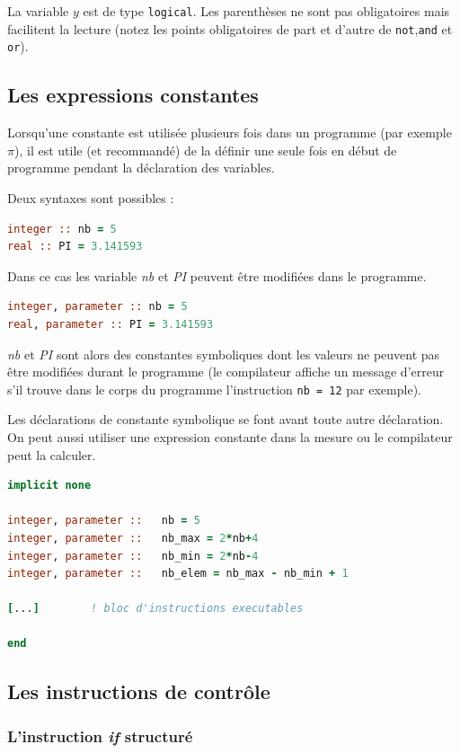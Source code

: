\documentclass[a4paper,twoside]{article}
\begin{document}
La variable $y$ est de type \texttt{logical}. Les parenthèses ne sont 
pas obligatoires mais facilitent la lecture (notez les points 
obligatoires de part et d'autre de \texttt{not},\texttt{and} et \texttt{or}).

\subsection{Les expressions constantes}\label{sec:constantes}
Lorsqu'une constante est utilisée plusieurs fois dans un programme (par exemple $\pi$), il est utile (et recommandé) de la définir une seule fois en début de programme pendant la déclaration des variables.
 
Deux syntaxes sont possibles :
\begin{lstlisting}[language=Fortran]
integer :: nb = 5
real :: PI = 3.141593
\end{lstlisting}
Dans ce cas les variable \emph{nb} et \emph{PI} peuvent être modifiées dans le programme.

\begin{lstlisting}[language=Fortran]
integer, parameter :: nb = 5
real, parameter :: PI = 3.141593
\end{lstlisting}
\emph{nb} et \emph{PI} sont alors des constantes symboliques dont les valeurs ne peuvent pas être modi\-fiées durant le programme (le compilateur affiche un message d'erreur s'il trouve dans le corps du programme l'instruction \texttt{nb = 12} par exemple).

Les déclarations de constante symbolique se font avant toute autre déclaration. On peut aussi utiliser une expression constante dans la mesure ou le compilateur peut la calculer. 

\begin{lstlisting}[language=Fortran]
implicit none
  
integer, parameter ::   nb = 5
integer, parameter ::   nb_max = 2*nb+4
integer, parameter ::   nb_min = 2*nb-4
integer, parameter ::   nb_elem = nb_max - nb_min + 1

[...]        ! bloc d'instructions executables 

end
\end{lstlisting}

\subsection{Les instructions de contrôle}
\subsubsection{L'instruction \emph{if} structuré}
\end{document}
